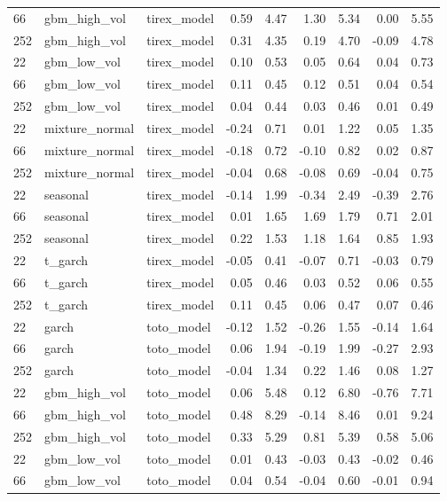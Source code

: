 {\begin{tabular}{lllrrrrrr}
66 & gbm\_high\_vol & tirex\_model & 0.59 & 4.47 & 1.30 & 5.34 & 0.00 & 5.55 \\
252 & gbm\_high\_vol & tirex\_model & 0.31 & 4.35 & 0.19 & 4.70 & -0.09 & 4.78 \\
\midrule
22 & gbm\_low\_vol & tirex\_model & 0.10 & 0.53 & 0.05 & 0.64 & 0.04 & 0.73 \\
66 & gbm\_low\_vol & tirex\_model & 0.11 & 0.45 & 0.12 & 0.51 & 0.04 & 0.54 \\
252 & gbm\_low\_vol & tirex\_model & 0.04 & 0.44 & 0.03 & 0.46 & 0.01 & 0.49 \\
\midrule
22 & mixture\_normal & tirex\_model & -0.24 & 0.71 & 0.01 & 1.22 & 0.05 & 1.35 \\
66 & mixture\_normal & tirex\_model & -0.18 & 0.72 & -0.10 & 0.82 & 0.02 & 0.87 \\
252 & mixture\_normal & tirex\_model & -0.04 & 0.68 & -0.08 & 0.69 & -0.04 & 0.75 \\
\midrule
22 & seasonal & tirex\_model & -0.14 & 1.99 & -0.34 & 2.49 & -0.39 & 2.76 \\
66 & seasonal & tirex\_model & 0.01 & 1.65 & 1.69 & 1.79 & 0.71 & 2.01 \\
252 & seasonal & tirex\_model & 0.22 & 1.53 & 1.18 & 1.64 & 0.85 & 1.93 \\
\midrule
22 & t\_garch & tirex\_model & -0.05 & 0.41 & -0.07 & 0.71 & -0.03 & 0.79 \\
66 & t\_garch & tirex\_model & 0.05 & 0.46 & 0.03 & 0.52 & 0.06 & 0.55 \\
252 & t\_garch & tirex\_model & 0.11 & 0.45 & 0.06 & 0.47 & 0.07 & 0.46 \\
\midrule
22 & garch & toto\_model & -0.12 & 1.52 & -0.26 & 1.55 & -0.14 & 1.64 \\
66 & garch & toto\_model & 0.06 & 1.94 & -0.19 & 1.99 & -0.27 & 2.93 \\
252 & garch & toto\_model & -0.04 & 1.34 & 0.22 & 1.46 & 0.08 & 1.27 \\
\midrule
22 & gbm\_high\_vol & toto\_model & 0.06 & 5.48 & 0.12 & 6.80 & -0.76 & 7.71 \\
66 & gbm\_high\_vol & toto\_model & 0.48 & 8.29 & -0.14 & 8.46 & 0.01 & 9.24 \\
252 & gbm\_high\_vol & toto\_model & 0.33 & 5.29 & 0.81 & 5.39 & 0.58 & 5.06 \\
\midrule
22 & gbm\_low\_vol & toto\_model & 0.01 & 0.43 & -0.03 & 0.43 & -0.02 & 0.46 \\
66 & gbm\_low\_vol & toto\_model & 0.04 & 0.54 & -0.04 & 0.60 & -0.01 & 0.94 \\

\end{tabular}}
